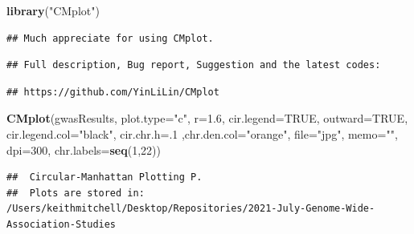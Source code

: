 \documentclass[
]{article}
\newenvironment{Shaded}{\begin{snugshade}}{\end{snugshade}}
\newcommand{\DataTypeTok}[1]{\textcolor[rgb]{0.13,0.29,0.53}{#1}}
\newcommand{\DecValTok}[1]{\textcolor[rgb]{0.00,0.00,0.81}{#1}}
\newcommand{\FloatTok}[1]{\textcolor[rgb]{0.00,0.00,0.81}{#1}}
\newcommand{\KeywordTok}[1]{\textcolor[rgb]{0.13,0.29,0.53}{\textbf{#1}}}
\newcommand{\NormalTok}[1]{#1}
\newcommand{\OtherTok}[1]{\textcolor[rgb]{0.56,0.35,0.01}{#1}}
\newcommand{\StringTok}[1]{\textcolor[rgb]{0.31,0.60,0.02}{#1}}
\begin{document}
\begin{Shaded}
\begin{Highlighting}[]
\KeywordTok{library}\NormalTok{(}\StringTok{"CMplot"}\NormalTok{)}
\end{Highlighting}
\end{Shaded}

\begin{verbatim}
## Much appreciate for using CMplot.
\end{verbatim}

\begin{verbatim}
## Full description, Bug report, Suggestion and the latest codes:
\end{verbatim}

\begin{verbatim}
## https://github.com/YinLiLin/CMplot
\end{verbatim}

\begin{Shaded}
\begin{Highlighting}[]
\KeywordTok{CMplot}\NormalTok{(gwasResults, }\DataTypeTok{plot.type=}\StringTok{"c"}\NormalTok{, }\DataTypeTok{r=}\FloatTok{1.6}\NormalTok{, }\DataTypeTok{cir.legend=}\OtherTok{TRUE}\NormalTok{,}
        \DataTypeTok{outward=}\OtherTok{TRUE}\NormalTok{, }\DataTypeTok{cir.legend.col=}\StringTok{"black"}\NormalTok{, }\DataTypeTok{cir.chr.h=}\NormalTok{.}\DecValTok{1}\NormalTok{ ,}\DataTypeTok{chr.den.col=}\StringTok{"orange"}\NormalTok{, }\DataTypeTok{file=}\StringTok{"jpg"}\NormalTok{,}
        \DataTypeTok{memo=}\StringTok{""}\NormalTok{, }\DataTypeTok{dpi=}\DecValTok{300}\NormalTok{, }\DataTypeTok{chr.labels=}\KeywordTok{seq}\NormalTok{(}\DecValTok{1}\NormalTok{,}\DecValTok{22}\NormalTok{))}
\end{Highlighting}
\end{Shaded}

\begin{verbatim}
##  Circular-Manhattan Plotting P.
##  Plots are stored in: /Users/keithmitchell/Desktop/Repositories/2021-July-Genome-Wide-Association-Studies
\end{verbatim}
\end{document}
